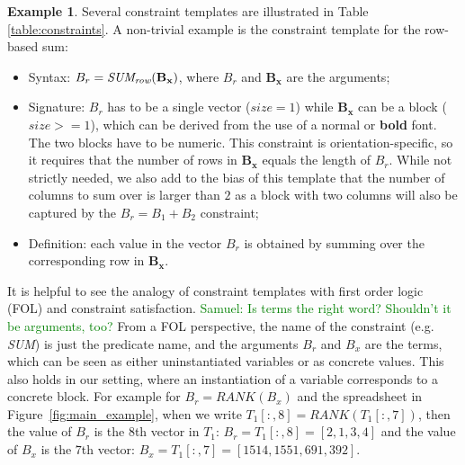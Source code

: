 \documentclass{IEEEtran}
\newcommand{\samuel}[1]{\textcolor{green}{{\sc Samuel:} #1}\xspace}
\newcommand{\CName}{Syntax\xspace}
\newcommand{\CSignature}{Signature\xspace}
\newcommand{\CFunction}{Definition\xspace}
\newcommand{\range}[3]{\ensuremath{#1[#2,#3]}}
\newcommand{\rangeall}{:}
\newcommand{\eccalc}[2]{\ensuremath{#1 = #2}}
\newcommand{\ecrank}[2]{\eccalc{#1}{\textit{RANK}(#2)}}
\newcommand{\ecsumr}[2]{\eccalc{#1}{\textit{SUM\textsubscript{row}}(#2)}}
\newcommand{\sg}{B}
\theoremstyle{definition}
\newtheorem{example}{Example}
\begin{document}
\begin{example}
Several constraint templates are illustrated in Table \ref{table:constraints}. A non-trivial example is the constraint template for the row-based sum:

\begin{itemize}
  \item \CName: $\ecsumr{\sg_r}{\mathbf{\sg_x}}$, where $\sg_r$ and $\mathbf{\sg_x}$ are the arguments;
  
  \item \CSignature: $\sg_r$ has to be a single vector ($\textit{size}=1$) while $\mathbf{\sg_x}$ can be a block ($\textit{size}>=1$), which can be derived from the use of a normal or \textbf{bold} font. The two blocks have to be numeric. This constraint is orientation-specific, so it requires that the number of rows in $\mathbf{\sg_x}$ equals the length of $\sg_r$. While not strictly needed, we also add to the bias of this template that the number of columns to sum over is larger than $2$ as a block with two columns will also be captured by the $\eccalc{\sg_r}{\sg_1 + \sg_2}$ constraint;
  
  \item \CFunction: each value in the vector $\sg_{r}$ is obtained by summing over the corresponding row in $\mathbf{\sg_x}$.
\end{itemize}
\end{example}


It is helpful to see the analogy of constraint templates with first order logic (FOL) and constraint satisfaction.
\samuel{Is terms the right word? Shouldn't it be arguments, too?}
From a FOL perspective, the name of the constraint (e.g. \textit{SUM}) is just the predicate name, and the arguments $B_r$ and $B_x$ are the terms, which can be seen as either uninstantiated variables or as concrete values.
This also holds in our setting, where an instantiation of a variable corresponds to a concrete block. For example for $\ecrank{B_r}{B_x}$ and the spreadsheet in Figure~\ref{fig:main_example}, when we write $\ecrank{\range{T_1}{\rangeall}{8}}{\range{T_1}{\rangeall}{7}}$, then the value of $B_r$ is the $8$th vector in $T_1$: $B_r = \range{T_1}{\rangeall}{8} = [2,1,3,4]$ and the value of $B_x$ is the $7$th vector: $B_x = \range{T_1}{\rangeall}{7} = [1514, 1551, 691, 392]$.

\end{document}
